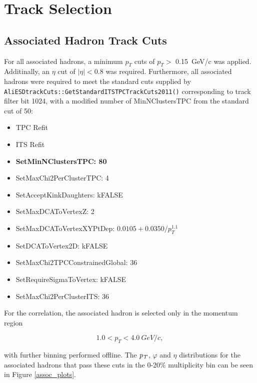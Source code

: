 \documentclass[ALICE,manyauthors]{ALICE_analysis_notes}
\begin{document}
\section{Track Selection}

\subsection{Associated Hadron Track Cuts}
\label{assoccuts}
For all associated hadrons, a minimum $p_{T}$ cuts of $p_{T} >$ \SI{0.15}{GeV/c} was applied.  Additinally, an $\eta$ cut of $|{\eta}| < 0.8$ was required. Furthermore, all associated hadrons were required to meet the standard cuts supplied by \texttt{AliESDtrackCuts::GetStandardITSTPCTrackCuts2011()} corresponding to track filter bit 1024, with a modified number of MinNClustersTPC from the standard cut of 50:

\begin{itemize}
    \item TPC Refit
    \item ITS Refit
	\item \textbf{SetMinNClustersTPC: 80}
	\item SetMaxChi2PerClusterTPC: 4
	\item SetAcceptKinkDaughters: kFALSE
	\item SetMaxDCAToVertexZ: 2
	\item SetMaxDCAToVertexXYPtDep: $0.0105+0.0350/p_{T}^{1.1}$
	\item SetDCAToVertex2D: kFALSE
	\item SetMaxChi2TPCConstrainedGlobal: 36
	\item SetRequireSigmaToVertex: kFALSE
	\item SetMaxChi2PerClusterITS: 36
\end{itemize}

For the correlation, the associated hadron is selected only in the momentum region

$${1.0 < p_{T} < \SI{4.0}{GeV/c}},$$ 

with further binning performed offline. The $\it{p}_{T}$, $\varphi$ and $\eta$ distributions for the associated hadrons that pass these cuts in the 0-20\% multiplicity bin can be seen in Figure \ref{assoc_plots}.
\end{document}
